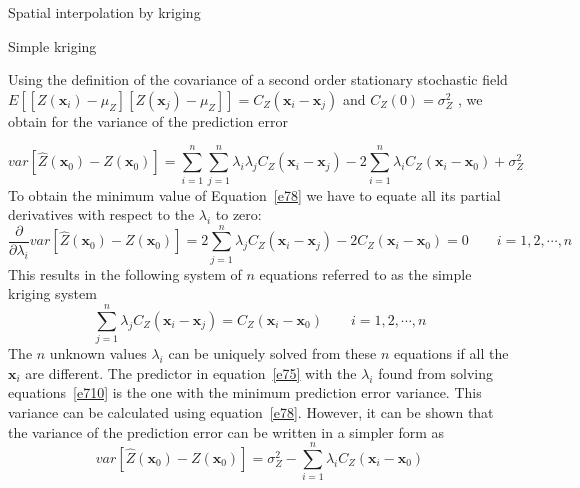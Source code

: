 \documentclass[8pt]{beamer}
\renewcommand{\emph}[1]{\textcolor{myorange}{#1}}
\begin{document}
 \begin{frame}{Spatial interpolation by kriging}
    \begin{block}{Simple kriging}
    \end{block}
    Using the definition of the \emph{covariance} of a \emph{second order stationary stochastic field} $E\left[[Z(\mathbf{x}_i)-\mu_Z]  [Z(\mathbf{x}_j)-\mu_Z] \right] = C_Z(\mathbf{x}_i - \mathbf{x}_j )$ and $C_Z(0) =\sigma_Z^2$ , we obtain for the \emph{variance} of the \emph{prediction error}

            \begin{equation}
                var[\hat{Z}(\mathbf{x}_0) -Z(\mathbf{x}_0)]  = \sum_{i=1}^n \sum_{j=1}^n \lambda_i \lambda_j C_Z(\mathbf{x}_i - \mathbf{x}_j) - 2\sum_{i=1}^n \lambda_i C_Z(\mathbf{x}_i - \mathbf{x}_0) + \sigma_Z^2
                \label{e78}
            \end{equation}
            To obtain the minimum value of Equation~\ref{e78} we have to equate all its partial derivatives with respect to the $\lambda_i$ to zero:
            \begin{equation}
                \frac{\partial}{\partial \lambda_i} var[\hat{Z}(\mathbf{x}_0)- Z(\mathbf{x}_0)] = 2 \sum_{j=1}^n \lambda_j C_Z(\mathbf{x}_i-\mathbf{x}_j)-2C_Z (\mathbf{x}_i - \mathbf{x}_0 ) = 0 \quad \quad i=1,2,\cdots,n
                \label{e79}
            \end{equation}
            This results in the following system of $n$ equations referred to as the \alert{simple kriging system}
            \vspace{-5pt}
            \begin{equation}
                \sum_{j=1}^n \lambda_j C_Z (\mathbf{x}_i -\mathbf{x}_j) = C_Z (\mathbf{x}_i-\mathbf{x}_0) \quad \quad i=1,2,\cdots,n
                \label{e710}
            \end{equation}
            The $n$ unknown values $\lambda_i$ can be uniquely solved from these $n$ equations if all the $\mathbf{x}_i$ are different. The predictor in equation~\ref{e75} with the $\lambda_i$ found from solving equations~\ref{e710} is the one with the minimum \emph{prediction error variance}. This \emph{variance} can be calculated using equation~\ref{e78}. However, it can be shown that the \emph{variance} of the \emph{prediction error} can be written in a simpler form as
            \vspace{-5pt}
            \begin{equation}
                var[\hat{Z}(\mathbf{x}_0)- Z(\mathbf{x}_0)] = \sigma_Z^2 - \sum_{i=1}^n \lambda_i C_Z(\mathbf{x}_i - \mathbf{x}_0)
                \label{e711}
            \end{equation}

\end{frame}
\end{document}

